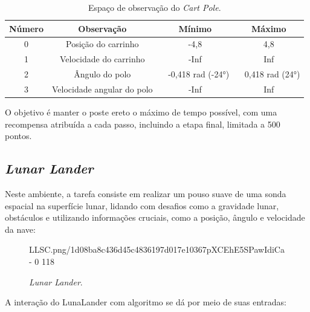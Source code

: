 \documentclass[12pt,           %
a4paper,                       %
openany,                       %
oneside,                       %
chapter=TITLE,                 %
english,                       %
spanish,                       %
brazil,                        %
sumario=tradicional]{abntex2}  %
\begin{document}
\begin{OnehalfSpace}
\begin{table}[H]
	\centering
	\vspace*{-0.2cm}
	\caption{Espaço de observação do \textit{Cart Pole}.}
        \begin{tabular}{|c|c|c|c|}
            \hline
            Número & Observação & Mínimo & Máximo  \\
            \hline
            0 & Posição do carrinho & -4,8 & 4,8\\
            \hline
            1 & Velocidade do carrinho & -Inf & Inf\\
            \hline
            2 & Ângulo do polo & ~ -0,418 rad (-24°) & ~ 0,418 rad (24°)\\
            \hline
            3 & Velocidade angular do polo & -Inf & Inf\\
            \hline
    \end{tabular}  
    \label{tab:outcartpole}                 %
\end{table}
\vspace*{-0.7cm}
{\raggedright {}}

O objetivo é manter o poste ereto o máximo de tempo possível, com uma recompensa atribuída a cada passo, incluindo a etapa final, limitada a 500 pontos.

\subsection{\textit{Lunar Lander}}
\label{sec:LL}

Neste ambiente, a tarefa consiste em realizar um pouso suave de uma sonda espacial na superfície lunar, lidando com desafios como a gravidade lunar, obstáculos e utilizando informações cruciais, como a posição, ângulo e velocidade da nave:

\begin{figure}[H]
    \centering
    \vspace*{-0.2cm}
    \caption{\textit{Lunar Lander}.}
    {LLSC.png/1d08ba8c436d45c4836197d017e10367pXCEhE5SPawIdiCa-}%
    {0}%
    {118}%
    \label{fig:GPC1}
\end{figure}
\vspace*{-.725cm}
{\raggedright {}}

A interação do LunaLander com algoritmo se dá por meio de suas entradas:


\end{OnehalfSpace}
\end{document}
